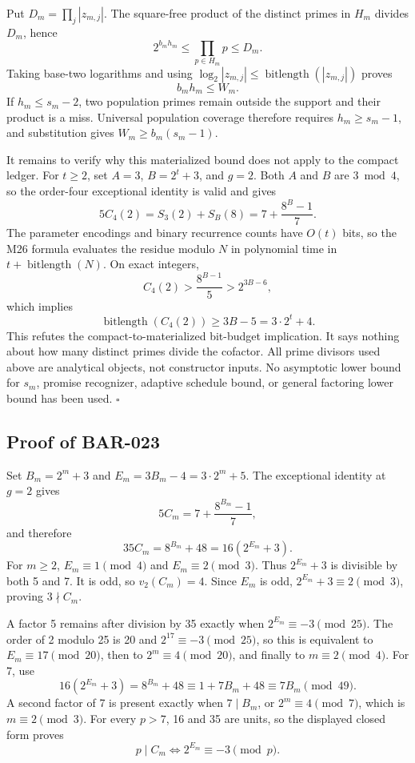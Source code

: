 \documentclass[11pt]{article}
\begin{document}
Put \(D_m=\prod_j|z_{m,j}|\). The square-free product of the distinct primes
in \(H_m\) divides \(D_m\), hence
\[
 2^{b_mh_m}
 \le\prod_{p\in H_m}p
 \le D_m.
\]
Taking base-two logarithms and using
\(\log_2|z_{m,j}|\le\operatorname{bitlength}(|z_{m,j}|)\) proves
\[
 b_mh_m\le W_m.
\]
If \(h_m\le s_m-2\), two population primes remain outside the support and
their product is a miss. Universal population coverage therefore requires
\(h_m\ge s_m-1\), and substitution gives
\(W_m\ge b_m(s_m-1)\).

It remains to verify why this materialized bound does not apply to the
compact ledger. For \(t\ge2\), set \(A=3\), \(B=2^t+3\), and \(g=2\).
Both \(A\) and \(B\) are \(3\bmod4\), so the order-four exceptional identity
is valid and gives
\[
 5C_4(2)=S_3(2)+S_B(8)=7+\frac{8^B-1}{7}.
\]
The parameter encodings and binary recurrence counts have \(O(t)\) bits,
so the M26 formula evaluates the residue modulo \(N\) in polynomial time in
\(t+\operatorname{bitlength}(N)\). On exact integers,
\[
 C_4(2)>\frac{8^{B-1}}5>2^{3B-6},
\]
which implies
\[
 \operatorname{bitlength}(C_4(2))\ge3B-5=3\cdot2^t+4.
\]
This refutes the compact-to-materialized bit-budget implication. It says
nothing about how many distinct primes divide the cofactor. All prime
divisors used above are analytical objects, not constructor inputs. No
asymptotic lower bound for \(s_m\), promise recognizer, adaptive schedule
bound, or general factoring lower bound has been used. \(\square\)

\subsection{Proof of BAR-023}\label{proof:BAR-023}

Set \(B_m=2^m+3\) and \(E_m=3B_m-4=3\cdot2^m+5\). The exceptional
identity at \(g=2\) gives
\[
5C_m=7+\frac{8^{B_m}-1}{7},
\]
and therefore
\[
35C_m=8^{B_m}+48=16(2^{E_m}+3).
\]
For \(m\ge2\), \(E_m\equiv1\pmod4\) and \(E_m\equiv2\pmod3\).
Thus \(2^{E_m}+3\) is divisible by both 5 and 7. It is odd, so
\(v_2(C_m)=4\). Since \(E_m\) is odd,
\(2^{E_m}+3\equiv2\pmod3\), proving \(3\nmid C_m\).

A factor 5 remains after division by 35 exactly when
\(2^{E_m}\equiv-3\pmod{25}\). The order of 2 modulo 25 is 20 and
\(2^{17}\equiv-3\pmod{25}\), so this is equivalent to
\(E_m\equiv17\pmod{20}\), then to \(2^m\equiv4\pmod{20}\), and finally to
\(m\equiv2\pmod4\). For 7, use
\[
16(2^{E_m}+3)=8^{B_m}+48
\equiv1+7B_m+48\equiv7B_m\pmod{49}.
\]
A second factor of 7 is present exactly when \(7\mid B_m\), or
\(2^m\equiv4\pmod7\), which is \(m\equiv2\pmod3\). For every \(p>7\),
16 and 35 are units, so the displayed closed form proves
\[
p\mid C_m\Longleftrightarrow2^{E_m}\equiv-3\pmod p.
\]
\end{document}
